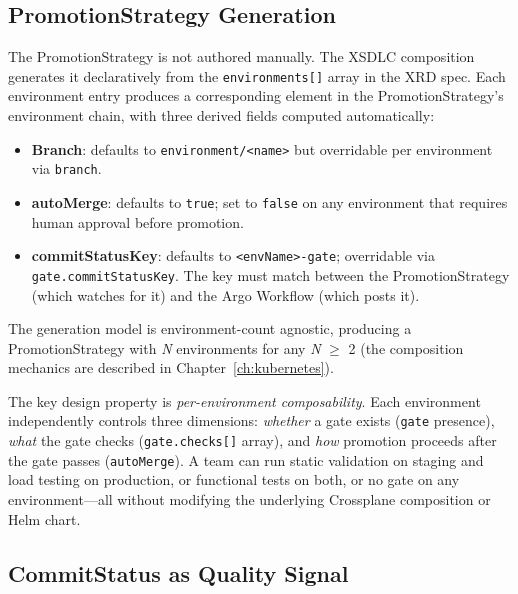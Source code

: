 \subsection{PromotionStrategy Generation}
\label{subsec:promotion-strategy}

The PromotionStrategy is not authored manually. The XSDLC composition generates it declaratively from the \texttt{environments[]} array in the XRD spec. Each environment entry produces a corresponding element in the PromotionStrategy's environment chain, with three derived fields computed automatically:

\begin{itemize}
    \item \textbf{Branch}: defaults to \texttt{environment/<name>} but overridable per environment via \texttt{branch}.
    \item \textbf{autoMerge}: defaults to \texttt{true}; set to \texttt{false} on any environment that requires human approval before promotion.
    \item \textbf{commitStatusKey}: defaults to \texttt{<envName>-gate}; overridable via \texttt{gate.\allowbreak commitStatusKey}. The key must match between the PromotionStrategy (which watches for it) and the Argo Workflow (which posts it).
\end{itemize}

The generation model is environment-count agnostic, producing a PromotionStrategy with \textit{N} environments for any \textit{N} $\geq$ 2 (the composition mechanics are described in Chapter~\ref{ch:kubernetes}).

The key design property is \textit{per-environment composability}. Each environment independently controls three dimensions: \textit{whether} a gate exists (\texttt{gate} presence), \textit{what} the gate checks (\texttt{gate.checks[]} array), and \textit{how} promotion proceeds after the gate passes (\texttt{autoMerge}). A team can run static validation on staging and load testing on production, or functional tests on both, or no gate on any environment---all without modifying the underlying Crossplane composition or Helm chart.

\subsection{CommitStatus as Quality Signal}
\label{subsec:commit-status-signal}

